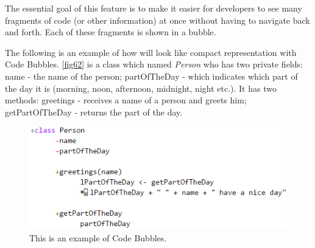 The essential goal of this feature is to make it easier for developers to see many fragments of code (or other information) at once without having to navigate back and forth. Each of these fragments is shown in a bubble.

The following is an example of how will look like compact representation with Code Bubbles. \autoref{fig62} is a class which named \textit{Person} who has two private fields: name - the name of the person; partOfTheDay - which indicates which part of the day it is (morning, noon, afternoon, midnight, night etc.). It has two methods: greetings - receives a name of a person and greets him; getPartOfTheDay - returns the part of the day.
\begin{figure}[H]
\includegraphics{"./fig/Code Bubbles"}
\caption{This is an example of Code Bubbles.}
\label{fig62}
\end{figure}